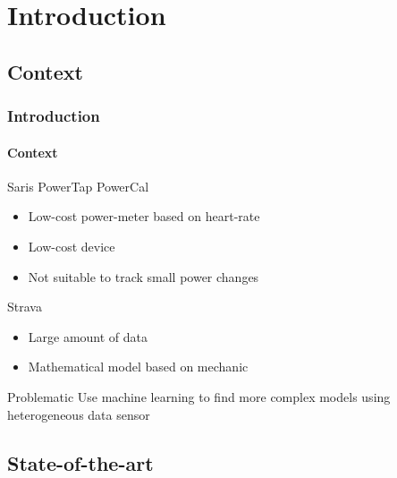 \documentclass{beamer}
\newcommand{\tick}{\color{green!60!black!80}\ding{51}}
\newcommand{\cross}{\color{red!60!black!80}\ding{55}}
\begin{document}
\section{Introduction}

\subsection{Context}

\begin{frame}
  \frametitle{Introduction}
  \framesubtitle{Context}
  \begin{block}{\small Saris PowerTap PowerCal}
    \begin{itemize}\small
    \item Low-cost power-meter based on heart-rate
    \item[\tick] Low-cost device
    \item[\cross] Not suitable to track small power changes
    \end{itemize}
  \end{block}
  \begin{block}{\small Strava}
    \begin{itemize}\small
    \item Large amount of data
    \item Mathematical model based on mechanic
    \end{itemize}
  \end{block}
  \begin{block}{\small Problematic}
    Use machine learning to find more complex models using heterogeneous data sensor
  \end{block}
\end{frame}

\subsection{State-of-the-art}
\end{document}
